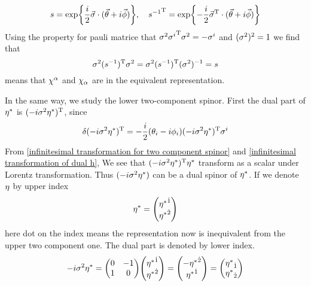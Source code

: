 \begin{equation} \label{finite transformation for upper two component spinor}
s =
\exp{\frac{i}{2}\vec{\sigma}\cdot(\vec{\theta}+i\vec{\phi})},
\quad
{s^{-1}}^{\text{T}} = \exp{-\frac{i}{2}\vec{\sigma}^{\text{T}}\cdot(\vec{\theta}+i\vec{\phi})}
\end{equation}
Using the property for pauli matrice that $\sigma^2{\sigma^{i}}^{\text{T}}\sigma^2 =- \sigma^i$ and $(\sigma^2)^2 =1$ we find that
\begin{equation} \label{equivalence of upper spinor with its dual space}
\sigma^2(s^{-1})^{\text{T}}\sigma^2 =\sigma^2(s^{-1})^{\text{T}}(\sigma^2)^{-1} =s
\end{equation}
means that $\chi^\alpha$ and $\chi_\alpha$ are in the equivalent representation.

In the same way, we study the lower two-component spinor. First the dual part of ${\eta^*}$ is $(-i\sigma^{2}{\eta^*})^{\text{T}}$, since
\begin{equation} \label{infinitesimal transformation of dual h}
\delta(-i\sigma^{2}{\eta^*})^{\text{T}}
= -\frac{i}{2}(\theta_i-i\phi_i)(-i\sigma^2{\eta^*})^{\text{T}}\sigma^{i}
\end{equation}
From \eqref{infinitesimal transformation for two component spinor} and \eqref{infinitesimal transformation of dual h}, We see that
$(-i\sigma^{2}{\eta^*})^{\text{T}}{\eta^*}$ transform as a scalar under Lorentz transformation. Thus $(-i\sigma^{2}{\eta^*})$ can be a dual spinor of ${\eta^*}$. If we denote $\eta$ by upper index
\begin{equation}
  \lh = \mqty({\lh}^{\dot{1}} \\ {\lh}^{\dot{2}})
\end{equation}
here dot on the index means the representation now is inequivalent from the upper two component one. The dual part is denoted by lower index.
\begin{equation}
  -i\s^2\lh = \mqty(0 & -1 \\ 1 & 0)
           \mqty(\lh^{\dot{1}}\\ \lh^{\dot{2}})
         = \mqty(-\lh^{\dot{2}}\\ \lh^{\dot{1}})
         = \mqty(\lh_{\dot{1}} \\ \lh_{\dot{2}})
\end{equation}

